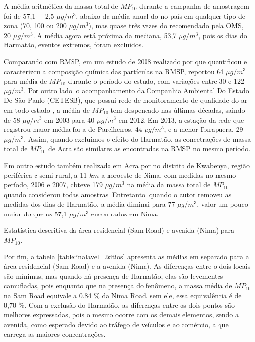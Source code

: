A média aritmética da massa total de $MP_{10}$ durante a campanha de amostragem 
foi de 57,1 $\pm$ 2,5 $\mu g/ m^3$, abaixo da média 
anual do no país em qualquer tipo de zona (70, 100 ou 200 $\mu g/ m^3$), 
mas quase três vezes do recomendado pela OMS, 20 $\mu g/m^3$.
A média agora está próxima da mediana, 53,7 $\mu g/ m^3$, 
pois os dias do Harmatão, eventos extremos, foram excluídos. 

Comparando com RMSP, em um estudo de 2008 realizado por \citet{souza2014}
que quantificou e caracterizou a composição química das partículas na RMSP,
reportou 64 $\mu g / m^3$ para média de $MP_{10}$ durante o período do estudo, 
com variações entre 30 e 122 $\mu g / m^3$. Por outro lado, o acompanhamento 
da Companhia Ambiental Do Estado De São Paulo (CETESB), que possui 
rede de monitoramento de qualidade do ar em todo estado \citep{cetesb2014}, 
a média de $MP_{10}$ tem despencado nas últimas décadas, saindo de 58 
$\mu g / m^3$ em 2003 para 40 $\mu g / m^3$ em 2012. Em 2013, a estação da rede
que registrou maior média foi a de Parelheiros, 44 $\mu g / m^3$, e a menor 
Ibirapuera, 29 $\mu g / m^3$. Assim, quando excluímos o efeito do Harmatão, 
as concetrações de massa total de $MP_{10}$ de Acra são similares as encontradas
na RMSP no mesmo período.

Em outro estudo também realizado em Acra por \citet{aboh2009} no distrito de 
Kwabenya, região periférica e semi-rural, a 11 $km$ a noroeste de Nima, com 
medidas no mesmo período, 2006 e 2007, obteve 179 $\mu g / m^3$ 
na média da massa total de $MP_{10}$ quando considerou todas amostras. 
Entretanto, quando o autor removeu as medidas dos dias de Harmatão, 
a média diminui para 77 $\mu g / m^3$,
valor um pouco maior do que os 57,1 $\mu g/ m^3$ encontrados em Nima.

\begin{table}[H]
  \centering
    
  \caption{Estatística descritiva da área residencial (Sam Road) e avenida (Nima) 
           para $MP_{10}$. \label{table:inalavel_2sitios}}
\end{table}

Por fim, a tabela \ref{table:inalavel_2sitios} apresenta as médias em separado
para a área residencial (Sam Road) e a avenida (Nima). As diferenças 
entre o dois locais são mínimas, mas quando há presença de Harmatão, 
elas são levementes camufladas, pois enquanto que na presença do fenômeno, 
a massa média de $MP_{10}$ na Sam Road equivale a 0,84 \% da Nima Road, 
sem ele, essa equivalência é de 0,70 \%. Com a exclusão do Harmatão, as 
diferenças entre os dois pontos são melhores expressadas, pois o mesmo ocorre 
com os demais elementos, sendo a avenida, como esperado devido ao tráfego de 
veículos e ao comércio, a que carrega as maiores concentrações.

